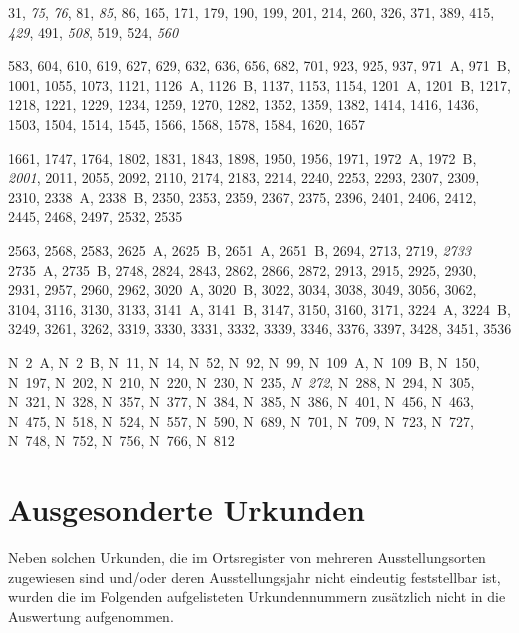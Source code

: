 {%
\setlength{\columnsep}{35pt} %
\raggedright
\begin{multicols}{2}
\begin{description}[font=\normalfont,labelsep=\fontdimen2\font]
\item[\cite{cao1},] 31, \emph{75}, \emph{76}, 81, \emph{85}, 86, 165, 171, 179,
190, 199, 201, 214, 260, 326, 371, 389, 415, \emph{429}, 491, \emph{508}, 519,
524, \emph{560}

\item[\cite{cao2},] 583, 604, 610, 619, 627, 629, 632, 636, 656, 682, 701, 923,
925, 937, 971~A, 971~B, 1001, 1055, 1073, 1121, 1126~A, 1126~B, 1137, 1153,
1154, 1201~A, 1201~B, 1217, 1218, 1221, 1229, 1234, 1259, 1270, 1282, 1352,
1359, 1382, 1414, 1416, 1436, 1503, 1504, 1514, 1545, 1566, 1568, 1578, 1584,
1620, 1657

\item[\cite{cao3},] 1661, 1747, 1764, 1802, 1831, 1843, 1898, 1950, 1956, 1971,
1972~A, 1972~B, \emph{2001}, 2011, 2055, 2092, 2110, 2174, 2183, 2214, 2240,
2253, 2293, 2307, 2309, 2310, 2338~A, 2338~B, 2350, 2353, 2359, 2367, 2375,
2396, 2401, 2406, 2412, 2445, 2468, 2497, 2532, 2535

\item[\cite{cao4},] 2563, 2568, 2583, 2625~A, 2625~B, 2651~A, 2651~B, 2694, 2713,
2719, \emph{2733} 2735~A, 2735~B, 2748, 2824, 2843, 2862, 2866, 2872, 2913,
2915, 2925, 2930, 2931, 2957, 2960, 2962, 3020~A, 3020~B, 3022, 3034, 3038,
3049, 3056, 3062, 3104, 3116, 3130, 3133, 3141~A, 3141~B, 3147, 3150, 3160,
3171, 3224~A, 3224~B, 3249, 3261, 3262, 3319, 3330, 3331, 3332, 3339, 3346,
3376, 3397, 3428, 3451, 3536

\item[\cite{cao5},] N~2~A, N~2~B, N~11, N~14, N~52, N~92, N~99, N~109~A,
N~109~B, N~150, N~197, N~202, N~210, N~220, N~230, N~235, \emph{N~272}, N~288,
N~294, N~305, N~321, N~328, N~357, N~377, N~384, N~385, N~386, N~401, N~456,
N~463, N~475, N~518, N~524, N~557, N~590, N~689, N~701, N~709, N~723, N~727,
N~748, N~752, N~756, N~766, N~812
\end{description}
\end{multicols}
}

\section{Ausgesonderte Urkunden}
\label{subsec:ausgesurk}

Neben solchen Urkunden, die im Ortsregister von \citet{cao-online} mehreren
Ausstellungsorten zugewiesen sind und/oder deren Ausstellungsjahr nicht
eindeutig feststellbar ist, wurden die im Folgenden aufgelisteten
Urkundennummern zusätzlich nicht in die Auswertung aufgenommen.

